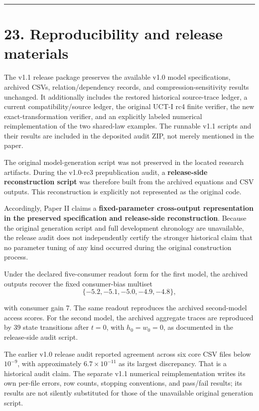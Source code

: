 \documentclass[
  11pt,
  a4paper,
]{article}
\begin{document}
\begin{center}\rule{0.5\linewidth}{0.5pt}\end{center}

\hypertarget{reproducibility-and-release-materials}{%
\section{23. Reproducibility and release
materials}\label{reproducibility-and-release-materials}}

The v1.1 release package preserves the available v1.0 model
specifications, archived CSVs, relation/dependency records, and
compression-sensitivity results unchanged. It additionally includes the
restored historical source-trace ledger, a current compatibility/source
ledger, the original UCT-I rc4 finite verifier, the new
exact-transformation verifier, and an explicitly labeled numerical
reimplementation of the two shared-law examples. The runnable v1.1
scripts and their results are included in the deposited audit ZIP, not
merely mentioned in the paper.

The original model-generation script was not preserved in the located
research artifacts. During the v1.0-rc3 prepublication audit, a
\textbf{release-side reconstruction script} was therefore built from the
archived equations and CSV outputs. This reconstruction is explicitly
not represented as the original code.

Accordingly, Paper II claims a \textbf{fixed-parameter cross-output
representation in the preserved specification and release-side
reconstruction}. Because the original generation script and full
development chronology are unavailable, the release audit does not
independently certify the stronger historical claim that no parameter
tuning of any kind occurred during the original construction process.

Under the declared five-consumer readout form for the first model, the
archived outputs recover the fixed consumer-bias multiset
\nopagebreak[4]
\[
\{-5.2,-5.1,-5.0,-4.9,-4.8\},
\]

with consumer gain 7. The same readout reproduces the archived
second-model access scores. For the second model, the archived aggregate
traces are reproduced by 39 state transitions after \(t=0\), with
\(h_0=w_0=0\), as documented in the release-side audit script.

The earlier v1.0 release audit reported agreement across six core CSV
files below \(10^{-9}\), with approximately \(6.7\times10^{-11}\) as its
largest discrepancy. That is a historical audit claim. The separate v1.1
numerical reimplementation writes its own per-file errors, row counts,
stopping conventions, and pass/fail results; its results are not
silently substituted for those of the unavailable original generation
script.
\end{document}
